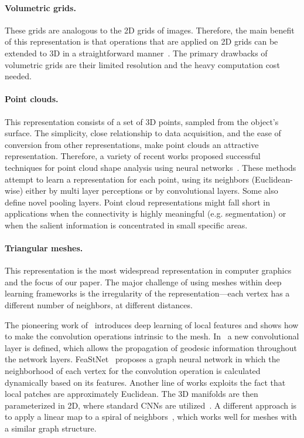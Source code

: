 \documentclass[acmtog]{acmart}
\begin{document}
\paragraph{Volumetric grids.}
These grids are analogous to the 2D grids of images.
Therefore, the main benefit of this representation is that operations that are applied on 2D grids can be extended to 3D  in a straightforward manner~\cite{wu20153d, brock2016generative, tchapmi2017segcloud, fanelli2011real, maturana2015voxnet, wang2019normalnet, sedaghat2016orientation, zhi2018toward}.
The primary drawbacks of volumetric grids are their limited resolution and the heavy computation cost needed.

\paragraph{Point clouds.}
This representation consists of a set of 3D points, sampled from the object's surface. 
The simplicity, close relationship to data acquisition, and the ease of conversion from other representations, make  point clouds an attractive representation.
Therefore, a variety of recent works proposed successful techniques for point cloud shape analysis using neural networks~\cite{qi2017pointnet, qi2017pointnet++, wang2019dynamic, guerrero2018pcpnet, williams2019deep, atzmon2018point, li2018pointcnn, liu2019relation, xu2019geometry, zhu2019random}.
These methods attempt to learn a representation for each point, using its neighbors (Euclidean-wise) either by multi layer perceptions or by convolutional layers.
Some also  define novel pooling layers.
Point cloud representations might fall short in applications when the connectivity is highly meaningful (e.g. segmentation) or when the salient information is concentrated in small specific areas.

\paragraph{Triangular meshes.}
This representation is the most widespread representation in computer graphics and the focus of our paper.
The major challenge of using meshes within deep learning frameworks is the irregularity of the representation---each vertex has a different number of neighbors, at different distances.

The pioneering work of~\cite{masci2015geodesic} introduces deep learning of local features and shows
 how to make the convolution operations intrinsic to the mesh.
In~\cite{poulenard2018multi} a new convolutional layer is defined, which allows the propagation of geodesic information throughout the network layers.
FeaStNet~\cite{verma2018feastnet} proposes a graph neural network in which the neighborhood of each vertex for the convolution operation is calculated dynamically based on its features.
Another line of works exploits the fact that local patches are approximately Euclidean. 
The 3D  manifolds are then parameterized  in 2D, where standard CNNs are utilized~\cite{henaff2015deep, sinha2016deep, boscaini2016learning, maron2017convolutional, ezuz2017gwcnn, haim2019surface}.
A different approach is to apply a linear map to a spiral of neighbors~\cite{gong2019spiralnet++, lim2018simple}, which works well for meshes with a similar graph structure.
\end{document}

